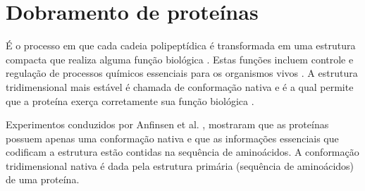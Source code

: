 
\section{Dobramento de proteínas}

É o processo em que cada cadeia polipeptídica é transformada em uma estrutura compacta que realiza alguma função biológica \cite{grantcharova2001mechanisms}. Estas funções incluem controle e regulação de processos químicos essenciais para os organismos vivos \cite{branden1999introduction}. A estrutura tridimensional mais estável é chamada de conformação nativa e é a qual permite que a proteína exerça corretamente sua função biológica \cite{lodish2000molecular, pedersen2000algorithms}.

Experimentos conduzidos por Anfinsen et al. \cite{sela1957reductive, anfinsen1972studies, anfinsen1961kinetics}, mostraram que as proteínas possuem apenas uma conformação nativa e que as informações essenciais que codificam a estrutura estão contidas na sequência de aminoácidos. A conformação tridimensional nativa é dada pela estrutura primária (sequência de aminoácidos) de uma proteína.

